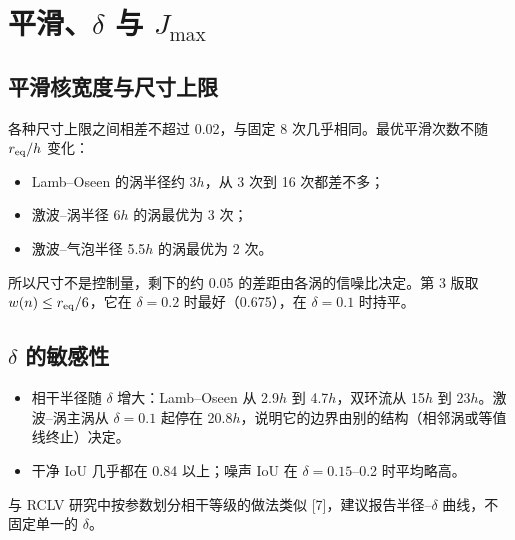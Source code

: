 \documentclass[10.5pt,a4paper]{article}
\theoremstyle{definition}
\theoremstyle{plain}
\theoremstyle{remark}
\begin{document}
\tableofcontents

\section{平滑、$\delta$ 与 $J_{\max}$}
\subsection{平滑核宽度与尺寸上限}
\begin{table}[H]\centering\small\caption{图平滑核的均方根宽度 $/h$（在 20 个节点上对 $\delta$ 函数平滑后取中位数）。}\end{table}
\begin{table}[H]\centering\small\caption{9 个参照涡、3 个噪声种子（激波–气泡为 2 个）下，噪声边界与参照边界 IoU 的平均值。}\end{table}
\begin{table}[H]\centering\small\caption{各涡在不同平滑次数下的噪声 IoU（$\delta=0.1$，种子平均）。}\resizebox{\linewidth}{!}{}\end{table}
各种尺寸上限之间相差不超过 0.02，与固定 8 次几乎相同。最优平滑次数不随 $r_{\rm eq}/h$ 变化：
\begin{itemize}
\item Lamb–Oseen 的涡半径约 3$h$，从 3 次到 16 次都差不多；
\item 激波–涡半径 6$h$ 的涡最优为 3 次；
\item 激波–气泡半径 5.5$h$ 的涡最优为 2 次。
\end{itemize}
所以尺寸不是控制量，剩下的约 0.05 的差距由各涡的信噪比决定。第 3 版取 $w(n)\le r_{\rm eq}/6$，它在 $\delta=0.2$ 时最好（0.675），在 $\delta=0.1$ 时持平。

\subsection{$\delta$ 的敏感性}
\begin{table}[H]\centering\small\caption{每格为“相干半径 $/h$ / 与参照的干净 IoU / 噪声 IoU（8 次平滑）”。}\resizebox{\linewidth}{!}{}\end{table}
\begin{itemize}
\item 相干半径随 $\delta$ 增大：Lamb–Oseen 从 2.9$h$ 到 4.7$h$，双环流从 15$h$ 到 23$h$。激波–涡主涡从 $\delta=0.1$ 起停在 20.8$h$，说明它的边界由别的结构（相邻涡或等值线终止）决定。
\item 干净 IoU 几乎都在 0.84 以上；噪声 IoU 在 $\delta=0.15$–0.2 时平均略高。
\end{itemize}
与 RCLV 研究中按参数划分相干等级的做法类似 [7]，建议报告半径–$\delta$ 曲线，不固定单一的 $\delta$。
\end{document}
